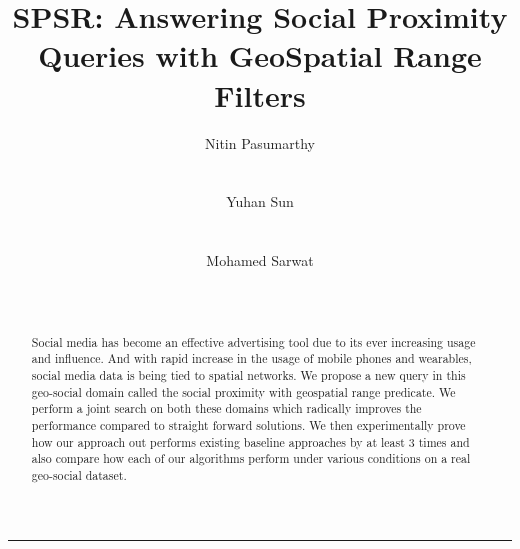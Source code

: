 \documentclass{sig-alternate-05-2015}
\newcommand{\orirrp}{SPSR}
\begin{document}
\title{{\orirrp}: Answering Social Proximity Queries with GeoSpatial Range Filters}

\author{
\alignauthor
Nitin Pasumarthy\\
       \\
       \\
\alignauthor
Yuhan Sun\\
       \\
       \\
\alignauthor
Mohamed Sarwat\\
       \\
       \\
}

\maketitle
\begin{abstract}
Social media has become an effective advertising tool due to its ever increasing usage and influence. And with rapid increase in the usage of mobile phones and wearables, social media data is being tied to spatial networks. We propose a new query in this geo-social domain called the social proximity with geospatial range predicate. We perform a joint search on both these domains which radically improves the performance compared to straight forward solutions. We then experimentally prove how our approach out performs existing baseline approaches by at least 3 times and also compare how each of our algorithms perform under various conditions on a real geo-social dataset.
\end{abstract}

\printccsdesc



















\begin{center}\rule{0.5\linewidth}{\linethickness}\end{center}
\end{document}
